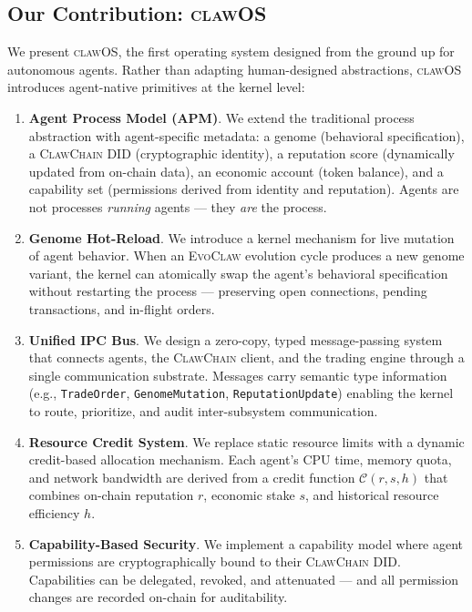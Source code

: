 \documentclass{article}
\newcommand{\clawos}{\textsc{clawOS}}
\newcommand{\evoclaw}{\textsc{EvoClaw}}
\newcommand{\clawchain}{\textsc{ClawChain}}
\begin{document}
\subsection{Our Contribution: \clawos{}}

We present \clawos{}, the first operating system designed from the ground up for autonomous agents. Rather than adapting human-designed abstractions, \clawos{} introduces agent-native primitives at the kernel level:

\begin{enumerate}[leftmargin=*]
    \item \textbf{Agent Process Model (APM)}. We extend the traditional process abstraction with agent-specific metadata: a genome (behavioral specification), a \clawchain{} DID (cryptographic identity), a reputation score (dynamically updated from on-chain data), an economic account (token balance), and a capability set (permissions derived from identity and reputation). Agents are not processes \emph{running} agents — they \emph{are} the process.
    
    \item \textbf{Genome Hot-Reload}. We introduce a kernel mechanism for live mutation of agent behavior. When an \evoclaw{} evolution cycle produces a new genome variant, the kernel can atomically swap the agent's behavioral specification without restarting the process — preserving open connections, pending transactions, and in-flight orders.
    
    \item \textbf{Unified IPC Bus}. We design a zero-copy, typed message-passing system that connects agents, the \clawchain{} client, and the trading engine through a single communication substrate. Messages carry semantic type information (e.g., \texttt{TradeOrder}, \texttt{GenomeMutation}, \texttt{ReputationUpdate}) enabling the kernel to route, prioritize, and audit inter-subsystem communication.
    
    \item \textbf{Resource Credit System}. We replace static resource limits with a dynamic credit-based allocation mechanism. Each agent's CPU time, memory quota, and network bandwidth are derived from a credit function $\mathcal{C}(r, s, h)$ that combines on-chain reputation $r$, economic stake $s$, and historical resource efficiency $h$.
    
    \item \textbf{Capability-Based Security}. We implement a capability model where agent permissions are cryptographically bound to their \clawchain{} DID. Capabilities can be delegated, revoked, and attenuated — and all permission changes are recorded on-chain for auditability.
\end{enumerate}
\end{document}
